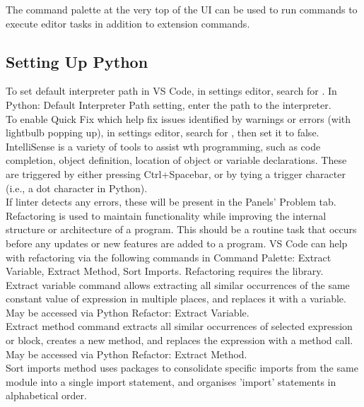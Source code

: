 The command palette at the very top of the UI can be used to run commands to execute editor tasks in addition to extension commands.\\

\subsection{Setting Up Python}

To set default interpreter path in VS Code, in settings editor, search for . In Python: Default Interpreter Path setting, enter the path to the interpreter.\\

To enable Quick Fix which help fix issues identified by warnings or errors (with lightbulb popping up), in settings editor, search for , then set it to false.\\

IntelliSense is a variety of tools to assist wth programming, such as code completion, object definition, location of object or variable declarations. These are triggered by either pressing Ctrl+Spacebar, or by tying a trigger character (i.e., a dot character in Python).\\

If linter detects any errors, these will be present in the Panels' Problem tab.\\

Refactoring is used to maintain functionality while improving the internal structure or architecture of a program. This should be a routine task that occurs before any updates or new features are added to a program. VS Code can help with refactoring via the following commands in Command Palette: Extract Variable, Extract Method, Sort Imports. Refactoring requires the  library.\\
Extract variable command allows extracting all similar occurrences of the same constant value of expression in multiple places, and replaces it with a variable. May be accessed via Python Refactor: Extract Variable.\\
Extract method command extracts all similar occurrences of selected expression or block, creates a new method, and replaces the expression with a method call. May be accessed via Python Refactor: Extract Method.\\
Sort imports method uses  packages to consolidate specific imports from the same module into a single import statement, and organises 'import' statements in alphabetical order.\\

